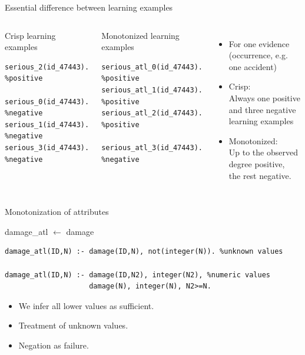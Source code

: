 \documentclass[xcolor=dvipsnames]{beamer}
\begin{document}
\begin{frame}[fragile]{Essential difference between learning examples}
\begin{columns}
\begin{block}{Crisp learning examples}
\begin{verbatim}
serious_2(id_47443). %positive
 
serious_0(id_47443). %negative
serious_1(id_47443). %negative
serious_3(id_47443). %negative
\end{verbatim}
\end{block}
\bigskip
{}
\begin{block}{Monotonized learning examples}
\begin{verbatim}
serious_atl_0(id_47443). %positive
serious_atl_1(id_47443). %positive
serious_atl_2(id_47443). %positive
 
serious_atl_3(id_47443). %negative
\end{verbatim}
\end{block}
\begin{itemize}
	\item For one evidence (occurrence, e.g. one accident)
	\bigskip
	\item Crisp:\\
	Always \alert{one} positive and \alert{three} negative learning examples
	\bigskip
	\item Monotonized:\\
	\alert{Up to the observed degree} positive,\\the rest negative.
\end{itemize}
\end{columns}
\end{frame}

\begin{frame}[fragile]{Monotonization of attributes}
\label{monotonization}
\begin{block}{damage\_atl $\leftarrow$ damage}
\begin{verbatim}
damage_atl(ID,N) :- damage(ID,N), not(integer(N)). %unknown values

damage_atl(ID,N) :- damage(ID,N2), integer(N2), %numeric values
                    damage(N), integer(N), N2>=N.
\end{verbatim}
\end{block}
\bigskip
\begin{itemize}
	\item We infer all lower values as sufficient.
	\item Treatment of unknown values.
	\item Negation as failure.
\end{itemize}
\end{frame}
\end{document}
